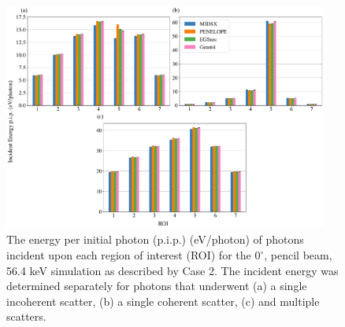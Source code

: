 
\begin{figure}[htpb]
    \centering
	\includegraphics[width=0.95\textwidth]{../figures/ROI_0_deg_pencil_paper_ready.pdf}
	\caption{The energy per initial photon (p.i.p.) (eV/photon) of photons incident upon each region of interest (ROI) for the $0^\circ$, pencil beam, 56.4 keV simulation as described by Case 2. The incident energy was determined separately for photons that underwent (a) a single incoherent scatter, (b) a single coherent scatter, (c) and multiple scatters.}
	\label{fig:ROIPGraph}
\end{figure}



